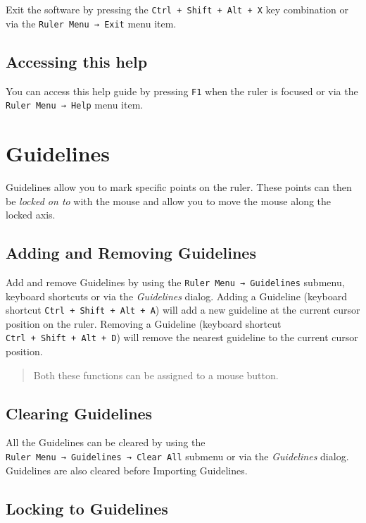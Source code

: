 \documentclass[
]{book}
\begin{document}
Exit the software by pressing the \texttt{Ctrl\ +\ Shift\ +\ Alt\ +\ X} key combination or via the \texttt{Ruler\ Menu\ →\ Exit} menu item.

\section{Accessing this help}\label{help}

You can access this help guide by pressing \texttt{F1} when the ruler is focused or via the \texttt{Ruler\ Menu\ →\ Help} menu item.

\chapter{Guidelines}\label{guidelines}

Guidelines allow you to mark specific points on the ruler.
These points can then be \emph{locked on to} with the mouse and allow you to move the mouse along the locked axis.

\section{Adding and Removing Guidelines}\label{adding-and-removing-guidelines}

Add and remove Guidelines by using the \texttt{Ruler\ Menu\ →\ Guidelines} submenu, keyboard shortcuts or via the \emph{Guidelines} dialog.
Adding a Guideline (keyboard shortcut \texttt{Ctrl\ +\ Shift\ +\ Alt\ +\ A}) will add a new guideline at the current cursor position on the ruler.
Removing a Guideline (keyboard shortcut \texttt{Ctrl\ +\ Shift\ +\ Alt\ +\ D}) will remove the nearest guideline to the current cursor position.

\begin{quote}
Both these functions can be assigned to a mouse button.
\end{quote}

\section{Clearing Guidelines}\label{clearing-guidelines}

All the Guidelines can be cleared by using the \texttt{Ruler\ Menu\ →\ Guidelines\ →\ Clear\ All} submenu or via the \emph{Guidelines} dialog.
Guidelines are also cleared before Importing Guidelines.

\section{Locking to Guidelines}\label{locking-to-guidelines}
\end{document}
